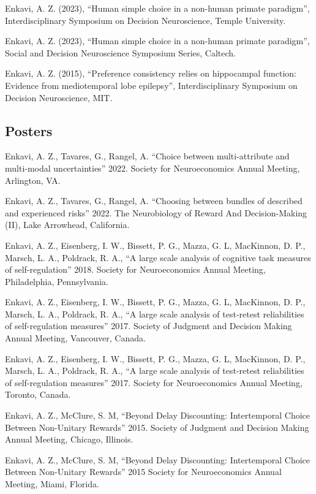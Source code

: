 \documentclass[11pt,]{article}
\begin{document}
Enkavi, A. Z. (2023), ``Human simple choice in a non-human primate
paradigm'', Interdisciplinary Symposium on Decision Neuroscience, Temple
University.

Enkavi, A. Z. (2023), ``Human simple choice in a non-human primate
paradigm'', Social and Decision Neuroscience Symposium Series, Caltech.

Enkavi, A. Z. (2015), ``Preference consistency relies on hippocampal
function: Evidence from mediotemporal lobe epilepsy'', Interdisciplinary
Symposium on Decision Neuroscience, MIT.

\hypertarget{posters}{%
\subsection{Posters}\label{posters}}

Enkavi, A. Z., Tavares, G., Rangel, A. ``Choice between multi-attribute
and multi-modal uncertainties'' 2022. Society for Neuroeconomics Annual
Meeting, Arlington, VA.

Enkavi, A. Z., Tavares, G., Rangel, A. ``Choosing between bundles of
described and experienced risks'' 2022. The Neurobiology of Reward And
Decision-Making (II), Lake Arrowhead, California.

Enkavi, A. Z., Eisenberg, I. W., Bissett, P. G., Mazza, G. L, MacKinnon,
D. P., Marsch, L. A., Poldrack, R. A., ``A large scale analysis of
cognitive task measures of self-regulation'' 2018. Society for
Neuroeconomics Annual Meeting, Philadelphia, Pennsylvania.

Enkavi, A. Z., Eisenberg, I. W., Bissett, P. G., Mazza, G. L, MacKinnon,
D. P., Marsch, L. A., Poldrack, R. A., ``A large scale analysis of
test-retest reliabilities of self-regulation measures'' 2017. Society of
Judgment and Decision Making Annual Meeting, Vancouver, Canada.

Enkavi, A. Z., Eisenberg, I. W., Bissett, P. G., Mazza, G. L, MacKinnon,
D. P., Marsch, L. A., Poldrack, R. A., ``A large scale analysis of
test-retest reliabilities of self-regulation measures'' 2017. Society
for Neuroeconomics Annual Meeting, Toronto, Canada.

Enkavi, A. Z., McClure, S. M, ``Beyond Delay Discounting: Intertemporal
Choice Between Non-Unitary Rewards'' 2015. Society of Judgment and
Decision Making Annual Meeting, Chicago, Illinois.

Enkavi, A. Z., McClure, S. M, ``Beyond Delay Discounting: Intertemporal
Choice Between Non-Unitary Rewards'' 2015 Society for Neuroeconomics
Annual Meeting, Miami, Florida.
\end{document}
